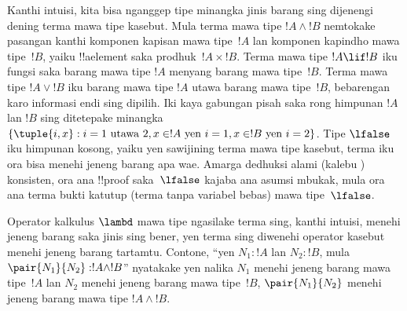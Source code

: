 \documentclass[../../../include/open-logic-section]{subfiles}
\begin{document}
Kanthi intuisi, kita bisa nganggep tipe minangka jinis barang sing
dijenengi dening terma mawa tipe kasebut. Mula terma mawa tipe
$!A \land !B$ nemtokake pasangan kanthi komponen kapisan mawa
tipe~$!A$ lan komponen kapindho mawa tipe~$!B$, yaiku !!a{element}
saka prodhuk~$!A \times !B$. Terma mawa tipe $!A \lif !B$ iku
fungsi saka barang mawa tipe $!A$ menyang barang mawa tipe~$!B$.
Terma mawa tipe $!A \lor !B$ iku barang mawa tipe $!A$ utawa barang
mawa tipe~$!B$, bebarengan karo informasi endi sing dipilih.
Iki kaya gabungan pisah saka rong himpunan $!A$ lan $!B$ sing
ditetepake minangka $\{\tuple{i,x} : i = 1 \text{ utawa } 2,
x \in !A \text{ yen } i = 1, x \in !B \text{ yen } i=2\}$.
Tipe $\lfalse$ iku himpunan kosong, yaiku yen sawijining terma mawa
tipe kasebut, terma iku ora bisa menehi jeneng barang apa wae.
Amarga dedhuksi alami (kalebu ) konsisten, ora ana
!!{proof} saka~$\lfalse$ kajaba ana asumsi mbukak, mula ora ana
terma bukti katutup (terma tanpa variabel bebas) mawa tipe~$\lfalse$.

Operator kalkulus $\lambd$ mawa tipe ngasilake terma sing, kanthi
intuisi, menehi jeneng barang saka jinis sing bener, yen terma sing
diwenehi operator kasebut menehi jeneng barang tartamtu. Contone,
``yen $N_1 : !A$ lan $N_2 : !B$, mula $\pair{N_1}{N_2} : !A \land !B$''
nyatakake yen nalika $N_1$ menehi jeneng barang mawa tipe~$!A$ lan
$N_2$ menehi jeneng barang mawa tipe~$!B$, $\pair{N_1}{N_2}$ menehi
jeneng barang mawa tipe $!A \land !B$.
\end{document}
